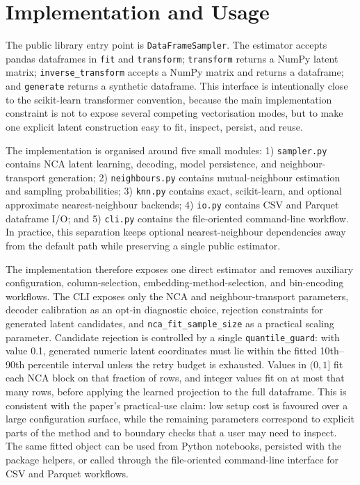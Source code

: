 \section{Implementation and Usage}
\label{sec:implementation}

The public library entry point is \texttt{DataFrameSampler}. The estimator
accepts pandas dataframes in \texttt{fit} and \texttt{transform};
\texttt{transform} returns a NumPy latent matrix; \texttt{inverse\_transform}
accepts a NumPy matrix and returns a dataframe; and \texttt{generate} returns a
synthetic dataframe. This interface is intentionally close to the scikit-learn
transformer convention, because the main implementation constraint is not to
expose several competing vectorisation modes, but to make one explicit latent
construction easy to fit, inspect, persist, and reuse.

The implementation is organised around five small modules: 1) \texttt{sampler.py}
contains NCA latent learning, decoding, model persistence, and
neighbour-transport generation; 2) \texttt{neighbours.py} contains
mutual-neighbour estimation and sampling probabilities; 3) \texttt{knn.py}
contains exact, scikit-learn, and optional approximate nearest-neighbour
backends; 4) \texttt{io.py} contains CSV and Parquet dataframe I/O; and
5) \texttt{cli.py} contains the file-oriented command-line workflow. In
practice, this separation keeps optional nearest-neighbour dependencies away
from the default path while preserving a single public estimator.

The implementation therefore exposes one direct estimator and removes auxiliary
configuration, column-selection, embedding-method-selection, and bin-encoding
workflows. The CLI exposes only the NCA and neighbour-transport parameters,
decoder calibration as an opt-in diagnostic choice, rejection constraints for
generated latent candidates, and \texttt{nca\_fit\_sample\_size} as a practical
scaling parameter. Candidate rejection is controlled by a single
\texttt{quantile\_guard}: with value 0.1, generated numeric latent coordinates
must lie within the fitted 10th--90th percentile interval unless the retry
budget is exhausted. Values in $(0,1]$ fit each NCA block on that fraction of
rows, and integer values fit on at most that many rows, before applying the
learned projection to the full dataframe. This is consistent with the paper's
practical-use claim: low setup cost is favoured over a large configuration
surface, while the remaining parameters correspond to explicit parts of the
method and to boundary checks that a user may need to inspect. The same fitted
object can be used from Python notebooks, persisted with the package helpers,
or called through the file-oriented command-line interface for CSV and Parquet
workflows.

